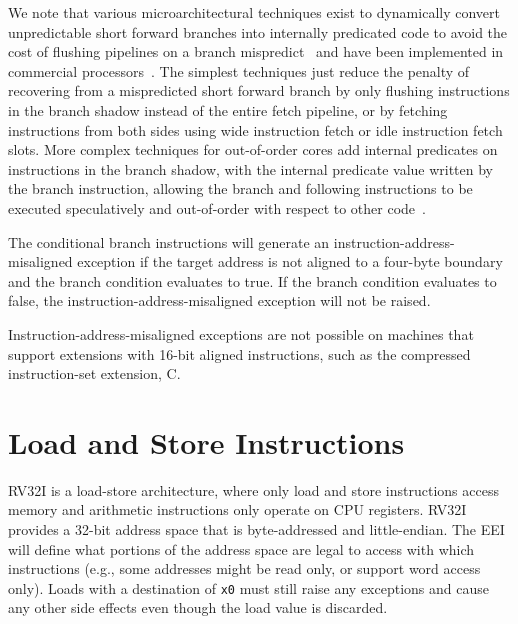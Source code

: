 \begin{commentary}
We note that various microarchitectural techniques exist to
dynamically convert unpredictable short forward branches into
internally predicated code to avoid the cost of flushing pipelines on
a branch mispredict~\cite{heil-tr1996,Klauser-1998,Kim-micro2005} and
have been implemented in commercial processors~\cite{ibmpower7}.
The simplest techniques just reduce the penalty of recovering from a
mispredicted short forward branch by only flushing instructions in the
branch shadow instead of the entire fetch pipeline, or by fetching
instructions from both sides using wide instruction fetch or idle
instruction fetch slots.  More complex techniques for out-of-order
cores add internal predicates on instructions in the branch shadow,
with the internal predicate value written by the branch instruction,
allowing the branch and following instructions to be executed
speculatively and out-of-order with respect to other code~\cite{ibmpower7}.
\end{commentary}

The conditional branch instructions will generate an
instruction-address-misaligned exception if the target address is not
aligned to a four-byte boundary and the branch condition evaluates
to true.  If the branch condition evaluates to false, the
instruction-address-misaligned exception will not be raised.

\begin{commentary}
Instruction-address-misaligned exceptions are not possible on machines
that support extensions with 16-bit aligned instructions, such as the
compressed instruction-set extension, C.
\end{commentary}

\section{Load and Store Instructions}

RV32I is a load-store architecture, where only load and store
instructions access memory and arithmetic instructions only operate on
CPU registers.  RV32I provides a 32-bit address space that is
byte-addressed and little-endian.  The EEI will
define what portions of the address space are legal to access with
which instructions (e.g., some addresses might be read only, or
support word access only).  Loads with a destination of {\tt x0} must
still raise any exceptions and cause any other side effects even
though the load value is discarded.


